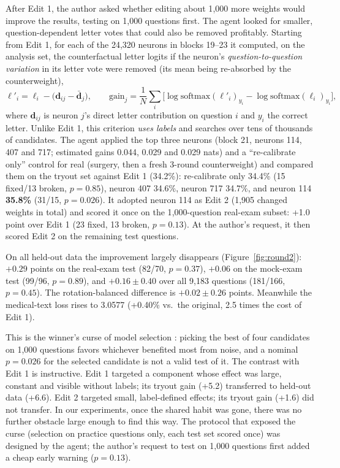 \documentclass[11pt]{article}
\newcommand{\vect}[1]{\boldsymbol{#1}}
\begin{document}
After Edit 1, the author asked whether editing about 1{,}000 more weights would improve the results, testing on 1{,}000 questions first. The agent looked for smaller, question-dependent letter votes that could also be removed profitably. Starting from Edit 1, for each of the 24{,}320 neurons in blocks 19--23 it computed, on the analysis set, the counterfactual letter logits if the neuron's \emph{question-to-question variation} in its letter vote were removed (its mean being re-absorbed by the counterweight),
\begin{equation}
\vect\ell'_i=\vect\ell_i-\big(\vect d_{ij}-\bar{\vect d}_j\big),\qquad
\mathrm{gain}_j=\frac1N\sum_i\Big[\log\mathrm{softmax}(\vect\ell'_i)_{y_i}-\log\mathrm{softmax}(\vect\ell_i)_{y_i}\Big],
\end{equation}
where $\vect d_{ij}$ is neuron $j$'s direct letter contribution on question $i$ and $y_i$ the correct letter. Unlike Edit 1, this criterion \emph{uses labels} and searches over tens of thousands of candidates. The agent applied the top three neurons (block 21, neurons 114, 407 and 717; estimated gains 0.044, 0.029 and 0.029 nats) and a ``re-calibrate only'' control for real (surgery, then a fresh 3-round counterweight) and compared them on the tryout set against Edit 1 (34.2\%): re-calibrate only 34.4\% (15 fixed/13 broken, $p=0.85$), neuron 407 34.6\%, neuron 717 34.7\%, and neuron 114 \textbf{35.8\%} (31/15, $p=0.026$). It adopted neuron 114 as Edit 2 (1{,}905 changed weights in total) and scored it once on the 1{,}000-question real-exam subset: +1.0 point over Edit 1 (23 fixed, 13 broken, $p=0.13$). At the author's request, it then scored Edit 2 on the remaining test questions.

On all held-out data the improvement largely disappears (Figure~\ref{fig:round2}): $+0.29$ points on the real-exam test (82/70, $p=0.37$), $+0.06$ on the mock-exam test (99/96, $p=0.89$), and $+0.16\pm0.40$ over all 9{,}183 questions (181/166, $p=0.45$). The rotation-balanced difference is $+0.02\pm0.26$ points. Meanwhile the medical-text loss rises to 3.0577 (+0.40\% vs.\ the original, 2.5 times the cost of Edit 1).

This is the winner's curse of model selection \citep{cawley2010overfitting}: picking the best of four candidates on 1{,}000 questions favors whichever benefited most from noise, and a nominal $p=0.026$ for the selected candidate is not a valid test of it. The contrast with Edit 1 is instructive. Edit 1 targeted a component whose effect was large, constant and visible without labels; its tryout gain (+5.2) transferred to held-out data (+6.6). Edit 2 targeted small, label-defined effects; its tryout gain (+1.6) did not transfer. In our experiments, once the shared habit was gone, there was no further obstacle large enough to find this way. The protocol that exposed the curse (selection on practice questions only, each test set scored once) was designed by the agent; the author's request to test on 1{,}000 questions first added a cheap early warning ($p=0.13$).
\end{document}
